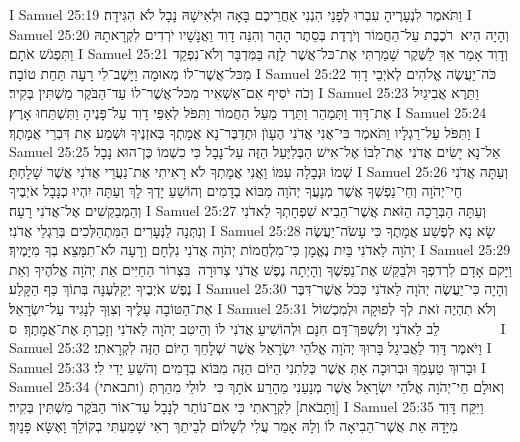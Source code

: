 I Samuel 25:19	וַתֹּאמֶר לִנְעָרֶיהָ עִבְרוּ לְפָנַי הִנְנִי אַחֲרֵיכֶם בָּאָה וּלְאִישָׁהּ נָבָל לֹא הִגִּידָה׃
I Samuel 25:20	וְהָיָה הִיא  רֹכֶבֶת עַל־הַחֲמוֹר וְיֹרֶדֶת בְּסֵתֶר הָהָר וְהִנֵּה דָוִד וַאֲנָשָׁיו יֹרְדִים לִקְרָאתָהּ וַתִּפְגֹשׁ אֹתָם׃
I Samuel 25:21	וְדָוִד אָמַר אַךְ לַשֶּׁקֶר שָׁמַרְתִּי אֶת־כּל־אֲשֶׁר לָזֶה בַּמִּדְבָּר וְלֹא־נִפְקַד מִכּל־אֲשֶׁר־לוֹ מְאוּמָה וַיָּשֶׁב־לִי רָעָה תַּחַת טוֹבָה׃
I Samuel 25:22	כֹּה־יַעֲשֶׂה אֱלֹהִים לְאֹיְבֵי דָוִד וְכֹה יֹסִיף אִם־אַשְׁאִיר מִכּל־אֲשֶׁר־לוֹ עַד־הַבֹּקֶר מַשְׁתִּין בְּקִיר׃
I Samuel 25:23	וַתֵּרֶא אֲבִיגַיִל אֶת־דָּוִד וַתְּמַהֵר וַתֵּרֶד מֵעַל הַחֲמוֹר וַתִּפֹּל לְאַפֵּי דָוִד עַל־פָּנֶיהָ וַתִּשְׁתַּחוּ אָרֶץ׃
I Samuel 25:24	וַתִּפֹּל עַל־רַגְלָיו וַתֹּאמֶר בִּי־אֲנִי אֲדֹנִי הֶעָוֺן וּתְדַבֶּר־נָא אֲמָתְךָ בְּאזְנֶיךָ וּשְׁמַע אֵת דִּבְרֵי אֲמָתֶךָ׃
I Samuel 25:25	אַל־נָא יָשִׂים אֲדֹנִי  אֶת־לִבּוֹ אֶל־אִישׁ הַבְּלִיַּעַל הַזֶּה עַל־נָבָל כִּי כִשְׁמוֹ כֶּן־הוּא נָבָל שְׁמוֹ וּנְבָלָה עִמּוֹ וַאֲנִי אֲמָתְךָ לֹא רָאִיתִי אֶת־נַעֲרֵי אֲדֹנִי אֲשֶׁר שָׁלָחְתָּ׃
I Samuel 25:26	וְעַתָּה אֲדֹנִי חַי־יְהֹוָה וְחֵי־נַפְשְׁךָ אֲשֶׁר מְנָעֲךָ יְהֹוָה מִבּוֹא בְדָמִים וְהוֹשֵׁעַ יָדְךָ לָךְ וְעַתָּה יִהְיוּ כְנָבָל אֹיְבֶיךָ וְהַמְבַקְשִׁים אֶל־אֲדֹנִי רָעָה׃
I Samuel 25:27	וְעַתָּה הַבְּרָכָה הַזֹּאת אֲשֶׁר־הֵבִיא שִׁפְחָתְךָ לַאדֹנִי וְנִתְּנָה לַנְּעָרִים הַמִּתְהַלְּכִים בְּרַגְלֵי אֲדֹנִי׃
I Samuel 25:28	שָׂא נָא לְפֶשַׁע אֲמָתֶךָ כִּי עָשֹׂה־יַעֲשֶׂה יְהֹוָה לַאדֹנִי בַּיִת נֶאֱמָן כִּי־מִלְחֲמוֹת יְהֹוָה אֲדֹנִי נִלְחָם וְרָעָה לֹא־תִמָּצֵא בְךָ מִיָּמֶיךָ׃
I Samuel 25:29	וַיָּקם אָדָם לִרְדפְךָ וּלְבַקֵּשׁ אֶת־נַפְשֶׁךָ וְהָיְתָה נֶפֶשׁ אֲדֹנִי צְרוּרָה  בִּצְרוֹר הַחַיִּים אֵת יְהֹוָה אֱלֹהֶיךָ וְאֵת נֶפֶשׁ אֹיְבֶיךָ יְקַלְּעֶנָּה בְּתוֹךְ כַּף הַקָּלַע׃
I Samuel 25:30	וְהָיָה כִּי־יַעֲשֶׂה יְהֹוָה לַאדֹנִי כְּכֹל אֲשֶׁר־דִּבֶּר אֶת־הַטּוֹבָה עָלֶיךָ וְצִוְּךָ לְנָגִיד עַל־יִשְׂרָאֵל׃
I Samuel 25:31	וְלֹא תִהְיֶה זֹאת  לְךָ לְפוּקָה וּלְמִכְשׁוֹל לֵב לַאדֹנִי וְלִשְׁפּךְ־דָּם חִנָּם וּלְהוֹשִׁיעַ אֲדֹנִי לוֹ וְהֵיטִב יְהֹוָה לַאדֹנִי וְזָכַרְתָּ אֶת־אֲמָתֶךָ׃ {ס}        
I Samuel 25:32	וַיֹּאמֶר דָּוִד לַאֲבִיגַל בָּרוּךְ יְהֹוָה אֱלֹהֵי יִשְׂרָאֵל אֲשֶׁר שְׁלָחֵךְ הַיּוֹם הַזֶּה לִקְרָאתִי׃
I Samuel 25:33	וּבָרוּךְ טַעְמֵךְ וּבְרוּכָה אָתְּ אֲשֶׁר כְּלִתִנִי הַיּוֹם הַזֶּה מִבּוֹא בְדָמִים וְהֹשֵׁעַ יָדִי לִי׃
I Samuel 25:34	וְאוּלָם חַי־יְהֹוָה אֱלֹהֵי יִשְׂרָאֵל אֲשֶׁר מְנָעַנִי מֵהָרַע אֹתָךְ כִּי  לוּלֵי מִהַרְתְּ (ותבאתי) [וַתָּבֹאת] לִקְרָאתִי כִּי אִם־נוֹתַר לְנָבָל עַד־אוֹר הַבֹּקֶר מַשְׁתִּין בְּקִיר׃
I Samuel 25:35	וַיִּקַּח דָּוִד מִיָּדָהּ אֵת אֲשֶׁר־הֵבִיאָה לוֹ וְלָהּ אָמַר עֲלִי לְשָׁלוֹם לְבֵיתֵךְ רְאִי שָׁמַעְתִּי בְקוֹלֵךְ וָאֶשָּׂא פָּנָיִךְ׃
